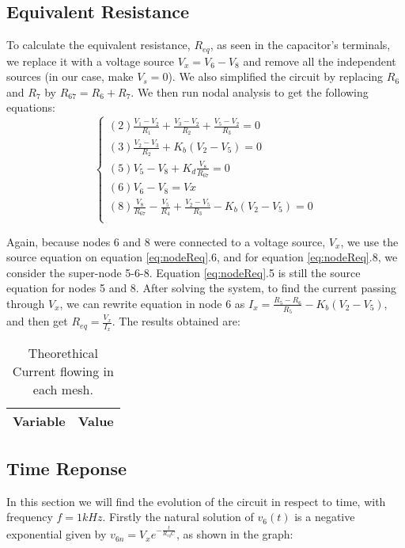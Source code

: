 \subsection{Equivalent Resistance}
\label{subsec:Req}
To calculate the equivalent resistance, $R_{eq}$, as seen in the capacitor's terminals, we replace it with a voltage source $V_x=V_6-V_8$ and remove all the independent sources (in our case, make $V_s=0$). We also simplified the circuit by replacing $R_6$ and $R_7$ by $R_{67}=R_6+R_7$. We then run nodal analysis to get the following equations:
\begin{equation}\label{eq:nodeReq}
\begin{cases}
  (2) \frac{V_1 - V_2}{R_1} + \frac{V_3 - V_2}{R_2} + \frac{V_5 - V_2}{R_3} = 0 \\
  (3) \frac{V_2 - V_3}{R_2} + K_b(V_2 - V_5) = 0 \\
  (5) V_5 - V_8 + K_d\frac{V_8}{R_{67}} = 0 \\
  (6) V_6 - V_8 = Vx \\
  (8) \frac{V_8}{R_{67}} - \frac{V_5}{R_4} + \frac{V_2 - V_5}{R_3} - K_b(V_2-V_5)= 0 \\
\end{cases}
\end{equation}

Again, because nodes 6 and 8 were connected to a voltage source, $V_x$, we use the source equation on equation \ref{eq:nodeReq}.6, and for equation \ref{eq:nodeReq}.8, we consider the super-node 5-6-8. Equation \ref{eq:nodeReq}.5 is still the source equation for nodes 5 and 8.
After solving the system, to find the current passing through $V_x$, we can rewrite equation in node 6 as $I_x= \frac{R_5 - R_6}{R_5} - K_b(V_2 - V_5)$, and then get $R_{eq}=\frac{V_x}{I_x}$.
The results obtained are:

\begin{table}[H]
  \centering
  \begin{tabular}{|l|r|}
    \hline
        {\bf Variable} & {\bf Value} \\ \hline
        
  \end{tabular}
  \caption{Theorethical Current flowing in each mesh.}
  \label{tab:mesh}
\end{table}


\subsection{Time Reponse}
In this section we will find the evolution of the circuit in respect to time, with frequency $f= 1kHz$.
Firstly the natural solution of $v_6(t)$ is a negative exponential given by $v_{6n}=V_xe^{-\frac{t}{R_{eq}C}}$, as shown in the graph:

